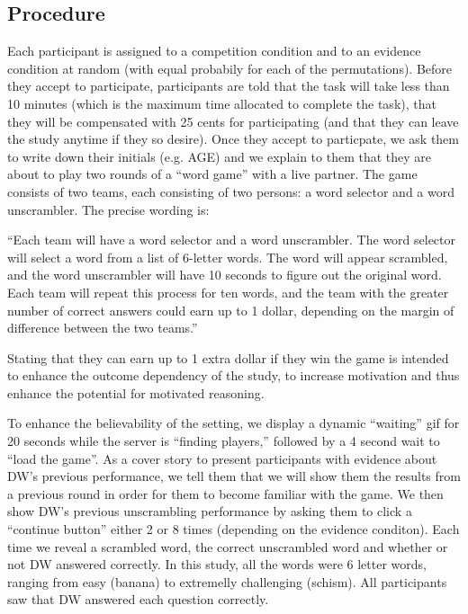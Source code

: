 \documentclass{article}
\begin{document}
\subsection{Procedure}

Each participant is assigned to a competition condition and to an evidence condition at random (with equal probabily for each of the permutations). Before they accept to participate, participants are told that the task will take less than 10 minutes (which is the maximum time allocated to complete the task), that they will be compensated with 25 cents for participating (and that they can leave the study anytime if they so desire). Once they accept to particpate, we ask them to write down their initials (e.g. AGE) and we explain to them that they are about to play two rounds of a ``word game'' with a live partner. The game consists of two teams, each consisting of two persons: a word selector and a word unscrambler. The precise wording is:

``Each team will have a word selector and a word unscrambler. The word selector will select a word from a list of 6-letter words. The word will appear scrambled, and the word unscrambler will have 10 seconds to figure out the original word. Each team will repeat this process for ten words, and the team with the greater number of correct answers could earn up to 1 dollar, depending on the margin of difference between the two teams.''

Stating that they can earn up to 1 extra dollar if they win the game is intended to enhance the outcome dependency of the study, to increase motivation and thus enhance the potential for motivated reasoning. 

To enhance the believability of the setting, we display a dynamic ``waiting'' gif for 20 seconds while the server is ``finding players,'' followed by a 4 second wait to ``load the game''. As a cover story to present participants with evidence about DW's previous performance, we tell them that we will show them the results from a previous round in order for them to become familiar with the game. We then show DW's previous unscrambling performance by asking them to click a ``continue button'' either 2 or 8 times (depending on the evidence conditon). Each time we reveal a scrambled word, the correct unscrambled word and whether or not DW answered correctly. In this study, all the words were 6 letter words, ranging from easy (banana) to extremelly challenging (schism). All participants saw that DW answered each question correctly.
\end{document}
